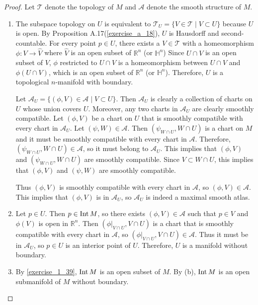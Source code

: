 \begin{proof}
  Let $\mathcal{T}$ denote the topology of $M$ and $\mathcal{A}$ denote the smooth structure of $M$.
  \begin{enumerate}[label=(\alph*)]
    \item
      The subspace topology on $U$ is equivalent to $\mathcal{T}_U = \{ V \in \mathcal{T} \mid V \subset U \}$ because $U$ is open.
      By Proposition A.17(\ref{exercise_a_18}), $U$ is Hausdorff and second-countable.
      For every point $p \in U$, there exists a $V \in \mathcal{T}$ with a homeomorphism $\phi: V \rightarrow \hat{V}$ where $\hat{V}$ is an open subset of $\mathbb{R}^n$ (or $\mathbb{H}^n$)
      Since $U \cap V$ is an open subset of $V$, $\phi$ restricted to $U \cap V$ is a homeomorphism between $U \cap V$ and $\phi(U \cap V)$, which is an open subset of $\mathbb{R}^n$ (or $\mathbb{H}^n$).
      Therefore, $U$ is a topological $n$-manifold with boundary.

      Let $\mathcal{A}_U = \{ (\phi, V) \in \mathcal{A} \mid V \subset U \}$.
      Then $\mathcal{A}_U$ is clearly a collection of charts on $U$ whose union covers $U$.
      Moreover, any two charts in $\mathcal{A}_U$ are clearly smoothly compatible.
      Let $(\phi, V)$ be a chart on $U$ that is smoothly compatible with every chart in $\mathcal{A}_U$.
      Let $(\psi, W) \in \mathcal{A}$.
      Then $(\psi_{W \cap U}, W \cap U)$ is a chart on $M$ and it must be smoothly compatible with every chart in $\mathcal{A}$.
      Therefore, $(\psi_{W \cap U}, W \cap U) \in \mathcal{A}$, so it must belong to $\mathcal{A}_U$.
      This implies that $(\phi, V)$ and $(\psi_{W \cap U}, W \cap U)$ are smoothly compatible.
      Since $V \subset W \cap U$, this implies that $(\phi, V)$ and $(\psi, W)$ are smoothly compatible.

      Thus $(\phi, V)$ is smoothly compatible with every chart in $\mathcal{A}$, so $(\phi, V) \in \mathcal{A}$.
      This implies that $(\phi, V)$ is in $\mathcal{A}_U$, so $\mathcal{A}_U$ is indeed a maximal smooth atlas.
    \item
      Let $p \in U$.
      Then $p \in \operatorname{Int} M$, so there exists $(\phi, V) \in \mathcal{A}$ such that $p \in V$ and $\phi(V)$ is open in $\mathbb{R}^n$.
      Then $(\phi\vert_{V \cap U}, V \cap U)$ is a chart that is smoothly compatible with every chart in $\mathcal{A}$, so $(\phi\vert_{V \cap U}, V \cap U) \in \mathcal{A}$.
      Thus it must be in $\mathcal{A}_U$, so $p \in U$ is an interior point of $U$.
      Therefore, $U$ is a manifold without boundary.
    \item
      By \ref{exercise_1_39}, $\operatorname{Int} M$ is an open subset of $M$.
      By (b), $\operatorname{Int} M$ is an open submanifold of $M$ without boundary.
  \end{enumerate}
\end{proof}
